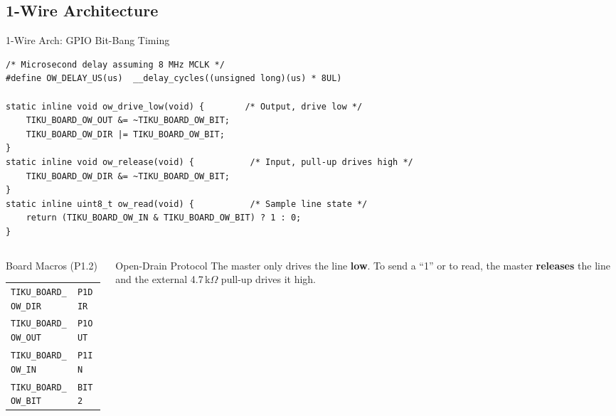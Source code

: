 \documentclass[aspectratio=169, 10pt]{beamer}
\begin{document}
\subsection{1-Wire Architecture}

\begin{frame}[fragile]{1-Wire Arch: GPIO Bit-Bang Timing}
\begin{lstlisting}[style=cstyle, basicstyle=\ttfamily\tiny,
  title={arch/msp430/tiku\_onewire\_arch.c --- timing and GPIO helpers}]
/* Microsecond delay assuming 8 MHz MCLK */
#define OW_DELAY_US(us)  __delay_cycles((unsigned long)(us) * 8UL)

static inline void ow_drive_low(void) {        /* Output, drive low */
    TIKU_BOARD_OW_OUT &= ~TIKU_BOARD_OW_BIT;
    TIKU_BOARD_OW_DIR |= TIKU_BOARD_OW_BIT;
}
static inline void ow_release(void) {           /* Input, pull-up drives high */
    TIKU_BOARD_OW_DIR &= ~TIKU_BOARD_OW_BIT;
}
static inline uint8_t ow_read(void) {           /* Sample line state */
    return (TIKU_BOARD_OW_IN & TIKU_BOARD_OW_BIT) ? 1 : 0;
}
\end{lstlisting}

\vspace{0.3em}
\begin{columns}[T]
\begin{column}{0.48\textwidth}
\begin{block}{Board Macros (P1.2)}
\scriptsize
\begin{tabular}{@{}ll@{}}
\texttt{TIKU\_BOARD\_OW\_DIR}  & \texttt{P1DIR} \\
\texttt{TIKU\_BOARD\_OW\_OUT}  & \texttt{P1OUT} \\
\texttt{TIKU\_BOARD\_OW\_IN}   & \texttt{P1IN}  \\
\texttt{TIKU\_BOARD\_OW\_BIT}  & \texttt{BIT2}  \\
\end{tabular}
\end{block}
\end{column}
\begin{column}{0.48\textwidth}
\begin{block}{Open-Drain Protocol}
The master only drives the line \textbf{low}.
To send a ``1'' or to read, the master
\textbf{releases} the line and the external
4.7\,k$\Omega$ pull-up drives it high.
\end{block}
\end{column}
\end{columns}
\end{frame}
\end{document}
